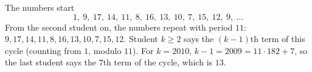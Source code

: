 The numbers start
\[
1,\ 9,\ 17,\ 14,\ 11,\ 8,\ 16,\ 13,\ 10,\ 7,\ 15,\ 12,\ 9,\ \dots
\]
From the second student on, the numbers repeat with period $11$: $9,17,14,11,8,16,13,10,7,15,12$. Student $k\ge2$ says the $(k-1)$th term of this cycle (counting from $1$, modulo $11$). For $k=2010$, $k-1=2009=11\cdot182+7$, so the last student says the $7$th term of the cycle, which is $\boxed{13}$.
